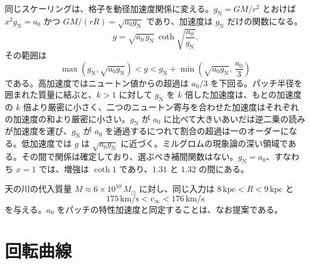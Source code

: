 \documentclass[a4paper]{article}
\begin{document}
同じスケーリングは、格子を動径加速度関係に変える。$g_{\text{N}}=GM/r^2$ とおけば $x^2g_{\text{N}}=a_0$ かつ $GM/(rR)=\sqrt{a_0g_{\text{N}}}$ であり、加速度は $g_{\text{N}}$ だけの関数になる。
\begin{equation}
\label{eq:dual-rar}
g=\sqrt{a_0\,g_{\text{N}}}\,\coth\sqrt{\frac{a_0}{g_{\text{N}}}}.
\end{equation}
その範囲は
\[
\max\!\left(g_{\text{N}},\sqrt{a_0g_{\text{N}}}\right)<g<g_{\text{N}}+\min\!\left(\sqrt{a_0g_{\text{N}}},\,\frac{a_0}{3}\right)
\]
である。高加速度ではニュートン値からの超過は $a_0/3$ を下回る。パッチ半径を囲まれた質量に結ぶと、$k>1$ に対して $g_{\text{N}}$ を $k$ 倍した加速度は、もとの加速度の $k$ 倍より厳密に小さく、二つのニュートン寄与を合わせた加速度はそれぞれの加速度の和より厳密に小さい。$g_{\text{N}}$ が $a_0$ に比べて大きいあいだは逆二乗の読みが加速度を運び、$g_{\text{N}}$ が $a_0$ を通過するにつれて割合の超過は一のオーダーになる。低加速度では $g$ は $\sqrt{a_0g_{\text{N}}}$ に近づく。ミルグロムの現象論の深い領域である。その間で関係は確定しており、選ぶべき補間関数はない。$g_{\text{N}}=a_0$、すなわち $x=1$ では、増強は $\coth 1$ であり、$1.31$ と $1.32$ の間にある。

天の川の代入質量 $M \approx 6 \times 10^{10}\,M_\odot$ に対し、同じ入力は $8\,\mathrm{kpc}<R<9\,\mathrm{kpc}$ と
\[
175\,\mathrm{km/s}<v_\infty<176\,\mathrm{km/s}
\]
を与える。$a_0$ をパッチの特性加速度と同定することは、なお提案である。

\section{回転曲線}
\label{sec:rotation}
\end{document}
